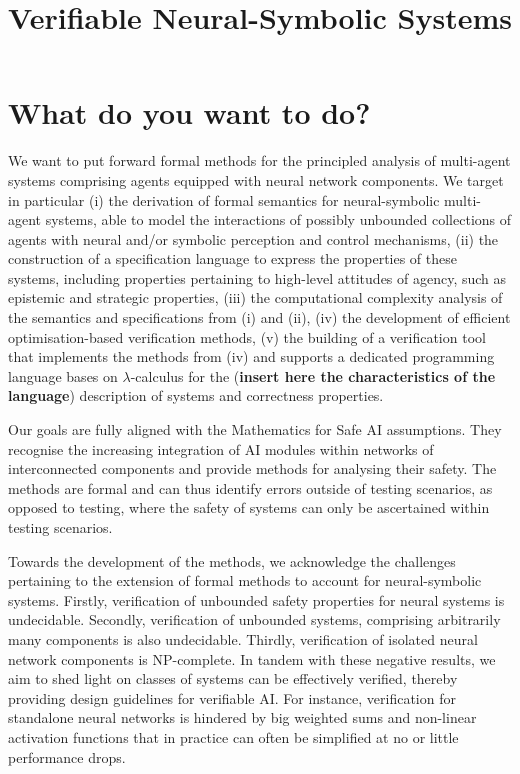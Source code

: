 \documentclass[11pt]{article}
\title{Verifiable Neural-Symbolic Systems}
\date{}
\begin{document}
\maketitle

\section{What do you want to do?}


We want to put forward formal methods for the principled
analysis of multi-agent systems comprising agents equipped
with neural network components. We target in particular (i)
the derivation of formal semantics for neural-symbolic
multi-agent systems, able to model the interactions of
possibly unbounded collections of agents with neural and/or
symbolic perception and control mechanisms, (ii) the
construction of a specification language to express the
properties of these systems, including properties pertaining
to high-level attitudes of agency, such as epistemic and
strategic properties, (iii) the computational complexity
analysis of the semantics and specifications from (i) and
(ii), (iv) the development of efficient
optimisation-based verification methods, (v) the building of
a verification tool that implements the methods from (iv)
and supports a dedicated programming language bases on
$\lambda$-calculus for the ({\bf insert here the
characteristics of the language}) description of systems and
correctness properties.

Our goals are fully aligned with the Mathematics for Safe AI
assumptions.  They recognise the increasing integration of
AI modules within networks of interconnected components and
provide methods for analysing their safety.  The methods are
formal and  can thus identify errors outside of testing
scenarios, as opposed to testing, where the safety of
systems can only be ascertained within testing scenarios.

Towards the development of the methods, we acknowledge the
challenges pertaining to the extension of formal methods to account
for neural-symbolic systems. Firstly, verification of
unbounded safety properties for neural systems is
undecidable. Secondly, verification of unbounded systems,
comprising arbitrarily many components is also undecidable.
Thirdly, verification of isolated neural network components
is NP-complete. In tandem with these negative results, we
aim to shed light on classes of systems can be effectively
verified, thereby providing design guidelines for verifiable
AI. For instance, verification for standalone neural
networks is hindered by big weighted sums and non-linear
activation functions that in practice can often be
simplified at no or little performance drops. 
\end{document}
